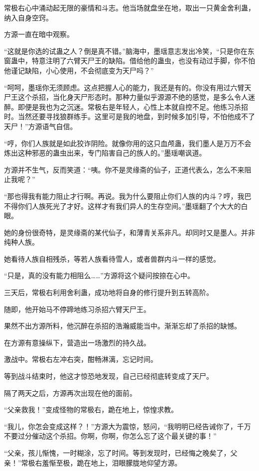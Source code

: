 \begin{this_body}
常极右心中涌动起无限的豪情和斗志。他当场就盘坐在地，取出一只黄金舍利蛊，纳入自身空窍。

方源一直在暗中观察。

“这就是你选的试蛊之人？倒是真不错。”脑海中，墨瑶意志发出冷笑，“只是你在东窗蛊中，特意注明了六臂天尸王的缺陷。借给他的蛊虫，也没有动过手脚，你不怕他谨记缺陷，小心使用，不会彻底变为天尸吗？”

“呵呵，墨瑶你无须顾虑。这点把握人心的能力，我还是有的。你没有用过六臂天尸王这个杀招，当化身天尸形态时。那种力量似乎源源不绝的感觉，是多么令人迷醉。即便是我也为之沉迷。常极右是年轻人，心性上本就自控不足。他练习杀招时。当然还要寻找狼群练手。这里可是我的地盘，到时候多加引导，不怕他成不了天尸！”方源语气自信。

“哼，你们人族就是如此狡诈阴险。就像你用的这只血颅蛊，我们墨人是万万不会炼出这种邪恶的蛊虫出来，专门陷害自己的族人的。”墨瑶嘲讽道。

方源并不生气，反而笑道：“咦。你不是灵缘斋的仙子，正道代表么，怎么不来阻止我呢？”

“那也得我有能力阻止才行啊。再说。我为什么要阻止你们人族的内斗？哼，我巴不得你们人族死光了才好。这样才有我们异人的生存空间。”墨瑶翻了个大大的白眼。

她的身份很奇特，是灵缘斋的某代仙子，和薄青关系非凡。却同时又是墨人。并非纯种人族。

她看待人族自相残杀，等若人族看待雪人，或者兽群内斗一样的感觉。

“只是，真的没有能力相阻么……”方源将这个疑问按捺在心中。

三天后，常极右利用舍利蛊，成功地将自身的修行提升到五转高阶。

随即，他开始马不停蹄地练习杀招六臂天尸王。

果然不出方源所料，他沉醉在杀招的浩瀚威能当中。渐渐忘却了杀招的缺憾。

在方源有意操纵下，营造出一场激烈的持久战。

激战中。常极右左冲右突，酣畅淋漓，忘记时间。

等到战斗结束时，他这才惊恐地发现，自己已经彻底转变成了天尸。

隔了两天之后，方源再次出现在他的面前。

“父亲救我！”变成怪物的常极右，跪在地上，惊惶求教。

“我儿，你怎会变成这样？！”方源大为震惊，怒问，“我明明已经告诫你了，千万不要过分催动这个杀招。你啊，你啊，你怎么忘了这个最关键的事！”

“父亲，孩儿惭愧，一时糊涂，忘了时间。等到发现时，已经悔之晚矣了，父亲！”常极右羞惭至极，跪在地上，泪眼朦胧地仰望方源。


\end{this_body}
